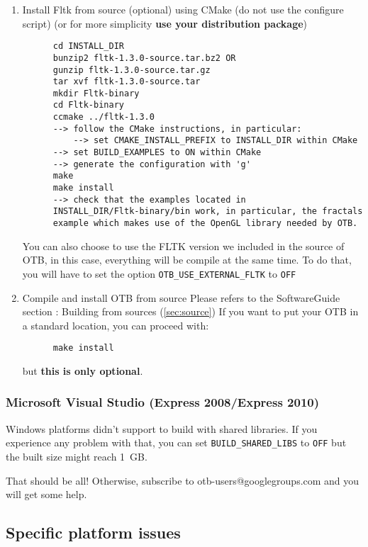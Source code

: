 \begin{enumerate}
\item Install Fltk from source (optional) using CMake (do not use the configure script) (or for more simplicity \textbf{use your distribution package})
  \begin{verbatim}
      cd INSTALL_DIR
      bunzip2 fltk-1.3.0-source.tar.bz2 OR
      gunzip fltk-1.3.0-source.tar.gz
      tar xvf fltk-1.3.0-source.tar
      mkdir Fltk-binary
      cd Fltk-binary
      ccmake ../fltk-1.3.0
      --> follow the CMake instructions, in particular:
          --> set CMAKE_INSTALL_PREFIX to INSTALL_DIR within CMake
	  --> set BUILD_EXAMPLES to ON within CMake
	  --> generate the configuration with 'g'
      make
      make install
      --> check that the examples located in
      INSTALL_DIR/Fltk-binary/bin work, in particular, the fractals
      example which makes use of the OpenGL library needed by OTB.
  \end{verbatim}

   You can also choose to use the FLTK version we included in the source of OTB, in this case, everything will be compile at the same time. To do that, you will have to set the option \texttt{OTB\_USE\_EXTERNAL\_FLTK} to \texttt{OFF}

\item Compile and install OTB from source
  Please refers to the SoftwareGuide section : Building from sources (\ref{sec:source})
  If you want to put your OTB in a standard location, you can proceed with:

  \begin{verbatim}
      make install
  \end{verbatim}

  but \textbf{this is only optional}.


\end{enumerate}

\subsubsection{Microsoft Visual Studio (Express 2008/Express 2010)}
Windows platforms didn't support to build with shared libraries. If you experience any problem
with that, you can set \texttt{BUILD\_SHARED\_LIBS} to \texttt{OFF} but the
built size might reach 1~GB.

That should be all! Otherwise, subscribe to
   otb-users@googlegroups.com and you will get some help.

\subsection{Specific platform issues}
